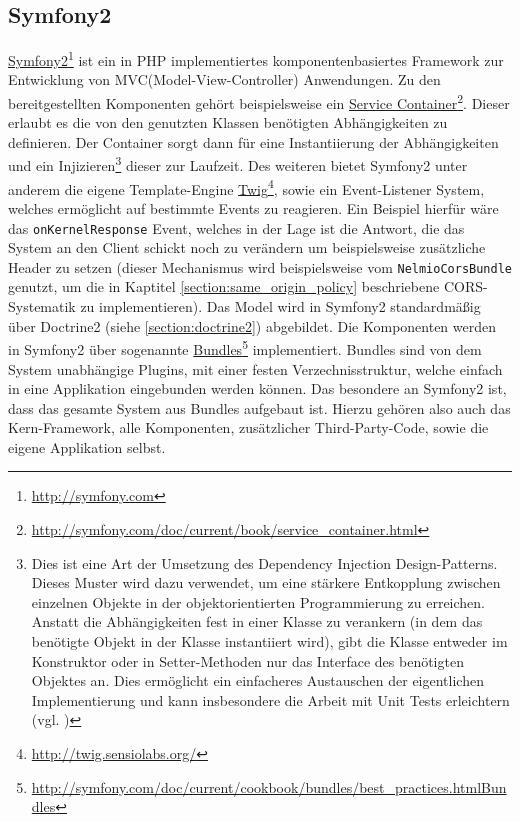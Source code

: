 \subsection{Symfony2}
\href{http://symfony.com}{Symfony2}\footnote{\url{http://symfony.com}} ist ein in PHP implementiertes komponentenbasiertes Framework zur Entwicklung von MVC(Model-View-Controller) Anwendungen. Zu den bereitgestellten Komponenten gehört beispielsweise ein \href{http://symfony.com/doc/current/book/service_container.html}{Service Container}\footnote{\url{http://symfony.com/doc/current/book/service_container.html}}. Dieser erlaubt es die von den genutzten Klassen benötigten Abhängigkeiten zu definieren. Der Container sorgt dann für eine Instantiierung der Abhängigkeiten und ein Injizieren\footnote{Dies ist eine Art der Umsetzung des Dependency Injection Design-Patterns. Dieses Muster wird dazu verwendet, um eine stärkere Entkopplung zwischen einzelnen Objekte in der objektorientierten Programmierung zu erreichen. Anstatt die Abhängigkeiten fest in einer Klasse zu verankern (in dem das benötigte Objekt in der Klasse instantiiert wird), gibt die Klasse entweder im Konstruktor oder in Setter-Methoden nur das Interface des benötigten Objektes an. Dies ermöglicht ein einfacheres Austauschen der eigentlichen Implementierung und kann insbesondere die Arbeit mit Unit Tests erleichtern (vgl. \cite{Fowler2004})} dieser zur Laufzeit. Des weiteren bietet Symfony2 unter anderem die eigene Template-Engine \href{http://twig.sensiolabs.org/}{Twig}\footnote{\url{http://twig.sensiolabs.org/}}, sowie ein Event-Listener System, welches ermöglicht auf bestimmte Events zu reagieren. Ein Beispiel hierfür wäre das \texttt{onKernelResponse} Event, welches in der Lage ist die Antwort, die das System an den Client schickt noch zu verändern um beispielsweise zusätzliche Header zu setzen (dieser Mechanismus wird beispielsweise vom \texttt{NelmioCorsBundle} genutzt, um die in Kaptitel \ref{section:same_origin_policy} beschriebene CORS-Systematik zu implementieren). Das Model wird in Symfony2 standardmäßig über Doctrine2 (siehe \ref{section:doctrine2}) abgebildet.
Die Komponenten werden in Symfony2 über sogenannte \href{http://symfony.com/doc/current/cookbook/bundles/best_practices.htmlBundles}{Bundles}\footnote{\url{http://symfony.com/doc/current/cookbook/bundles/best_practices.htmlBundles}} implementiert. Bundles sind von dem System unabhängige Plugins, mit einer festen Verzechnisstruktur, welche einfach in eine Applikation eingebunden werden können. Das besondere an Symfony2 ist, dass das gesamte System aus Bundles aufgebaut ist. Hierzu gehören also auch das Kern-Framework, alle Komponenten, zusätzlicher Third-Party-Code, sowie die eigene Applikation selbst.

